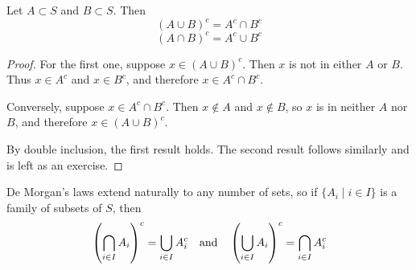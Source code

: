 \begin{proposition}
Let $A \subset S$ and $B \subset S$. Then
\begin{equation}
(A \cup B)^c = A^c \cap B^c
\end{equation}
\begin{equation}
(A \cap B)^c = A^c \cup B^c
\end{equation}
\end{proposition}
\begin{proof}
For the first one, suppose $x \in (A \cup B)^c$. Then $x$ is not in either $A$ or $B$. Thus $x \in A^c$ and $x \in B^c$, and therefore $x \in A^c \cap B^c$. 

Conversely, suppose $x \in A^c \cap B^c$. Then $x \notin A$ and $x \notin B$, so $x$ is in neither $A$ nor $B$, and therefore $x \in (A \cup B)^c$.

By double inclusion, the first result holds. The second result follows similarly and is left as an exercise.
\end{proof}

De Morgan’s laws extend naturally to any number of sets, so if $\{A_i \mid i \in I\}$ is a family of subsets of $S$, then
\[ \left(\bigcap_{i\in I}A_i\right)^c = \bigcup_{i\in I}A_i^c \quad \text{and} \quad \left(\bigcup_{i\in I}A_i\right)^c = \bigcap_{i\in I}A_i^c \]

